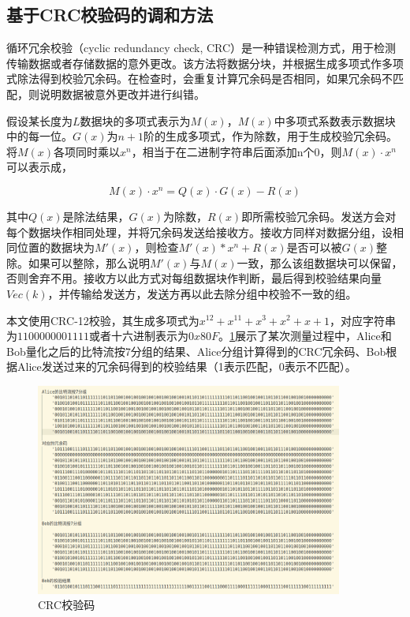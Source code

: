 \documentclass[master]{seuthesis} %
\begin{document}
\begin{Main}
\subsection{基于CRC校验码的调和方法}

循环冗余校验（cyclic redundancy check, CRC）是一种错误检测方式，用于检测传输数据或者存储数据的意外更改。该方法将数据分块，并根据生成多项式作多项式除法得到校验冗余码。在检查时，会重复计算冗余码是否相同，如果冗余码不匹配，则说明数据被意外更改并进行纠错。

假设某长度为$L$数据块的多项式表示为$M(x)$，$M(x)$中多项式系数表示数据块中的每一位。$G(x)$为$n+1阶$的生成多项式，作为除数，用于生成校验冗余码。将$M(x)$各项同时乘以$x^n$，相当于在二进制字符串后面添加n个0，则$M(x) \cdot x^n$可以表示成，

\begin{equation}
    M(x) \cdot x^n = Q(x) \cdot G(x) - R(x) 
\end{equation}

其中$Q(x)$是除法结果，$G(x)$为除数，$R(x)$即所需校验冗余码。发送方会对每个数据块作相同处理，并将冗余码发送给接收方。接收方同样对数据分组，设相同位置的数据块为$M'(x)$，则检查$M'(x) * x^n + R(x)$是否可以被$G(x)$整除。如果可以整除，那么说明$M'(x)$与$M(x)$一致，那么该组数据块可以保留，否则舍弃不用。接收方以此方式对每组数据块作判断，最后得到校验结果向量$Vec(k)$，并传输给发送方，发送方再以此去除分组中校验不一致的组。

本文使用CRC-12校验，其生成多项式为$x^{12}+x^{11}+x^{3}+x^{2}+x+1$，对应字符串为$1100000001111$或者十六进制表示为$0x80F$。\ref{bitstream_and_crccode}展示了某次测量过程中，Alice和Bob量化之后的比特流按7分组的结果、Alice分组计算得到的CRC冗余码、Bob根据Alice发送过来的冗余码得到的校验结果（1表示匹配，0表示不匹配）。

\begin{figure}[htbp!]
    \centering \includegraphics[width=0.9\textwidth]{images/bitstream_and_crccode} 
    \caption{CRC校验码}
    \label{bitstream_and_crccode}
\end{figure}


\end{Main}
\end{document}

